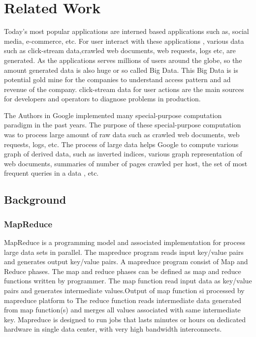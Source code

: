 
\chapter{Related Work} %

\label{Chapter2} %




Today's most popular applications are interned based applications such as, social media, e-commerce, etc. For user interact with these applications , various data such as  click-stream data,crawled web documents, web requests, logs etc, are generated. As the applications serves millions of users around the globe, so the amount generated data is also huge or so called Big Data. This Big Data is is potential gold mine for the companies to understand access pattern and ad revenue of the company.  click-stream data for user actions are the main sources for developers and operators to diagnose problems in production.

    The Authors in Google implemented many special-purpose computation paradigm in the past years. The purpose of these special-purpose computation was to process large amount of raw data such as crawled web documents, web requests, logs, etc. The process of large data helps Google to compute various graph of derived data, such as inverted indices, various graph representation of web documents, summaries of number of pages crawled per host, the set of most frequent queries in a data , etc.

\section{Background}

\subsection{MapReduce}

MapReduce is a programming model and associated implementation for process large data sets in parallel. The mapreduce program reads input key/value pairs and generates output key/value pairs. A mapreduce program consist of Map and Reduce phases. The map and reduce phases can be defined as map and reduce functions written by programmer. The map function read input data as  key/value pairs and generates intermediate values.Output of map function si processed by mapreduce platform to  The reduce function reads intermediate data generated from map function(s) and merges all values associated with same intermediate key.
Mapreduce is designed to run jobs that lasts minutes or hours on dedicated hardware in single data center, with very high bandwidth interconnects.  


